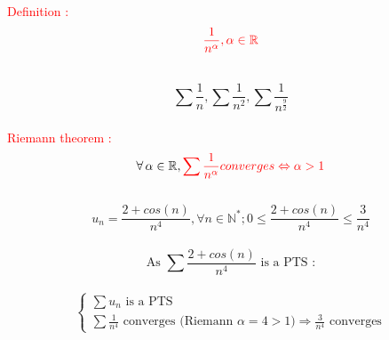 \documentclass[a4paper,12pt]{article}
\begin{document}
\textcolor{red}{Definition :} \\

\[
\textcolor{red}{\frac{1}{n^\alpha}, \alpha \in \mathbb{R}}
\]

 \\
\[
    \sum \frac{1}{n} , \sum \frac{1}{n^2}, \sum \frac{1}{n^\frac{9}{2}}
\] 
\\

\textcolor{red}{Riemann theorem :}\\
\[
\forall \,\alpha \in \mathbb{R}, \textcolor{red}{\sum{\frac{1}{n^\alpha}}} \textcolor{red}{   converges \Leftrightarrow \alpha > 1} 
\]
\\
\[
    u_n = \frac{2 + cos(n)}{n^4}, \forall n\in \mathbb{N^*}; 0 \leq \frac{2 + cos(n)}{n^4}\leq \frac{3}{n^4}
\] \\

\[
\text{As } \sum \frac{2 + cos(n)}{n^4} \text { is a PTS :}
\] \\

\[
\begin{cases}
    \sum u_n \text{ is a PTS}\\
    \sum \frac{1}{n^4} \text{ converges (Riemann } \alpha = 4 > 1\text{)} \Rightarrow \frac{3}{n^4} \text{ converges}
\end{cases}
\] \\
\end{document}
